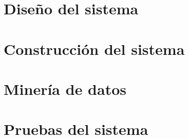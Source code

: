 \null\vfill

\chapter{Diseño del sistema}




\newpage{\ }
\cleardoublepage

\chapter{Construcción del sistema}


\newpage{\ }
\cleardoublepage

\chapter{Minería de datos}


\newpage{\ }
\cleardoublepage

\chapter{Pruebas del sistema}



% 